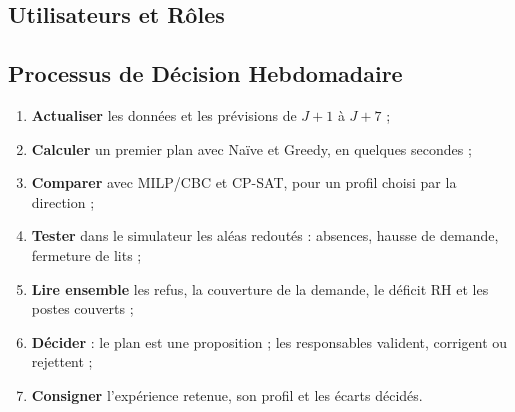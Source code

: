 \subsection{Utilisateurs et Rôles}
\begin{table}[H]
    \centering
    \caption{Utilisateurs visés et vues du tableau de bord associées.}
    \label{tab:utilisateurs}
\end{table}

\subsection{Processus de Décision Hebdomadaire}
\begin{enumerate}
    \item \textbf{Actualiser} les données et les prévisions de $J+1$ à $J+7$ ;
    \item \textbf{Calculer} un premier plan avec Naïve et Greedy, en quelques secondes ;
    \item \textbf{Comparer} avec MILP/CBC et CP-SAT, pour un profil choisi par la direction ;
    \item \textbf{Tester} dans le simulateur les aléas redoutés : absences, hausse de demande, fermeture de lits ;
    \item \textbf{Lire ensemble} les refus, la couverture de la demande, le déficit RH et les postes couverts ;
    \item \textbf{Décider} : le plan est une proposition ; les responsables valident, corrigent ou rejettent ;
    \item \textbf{Consigner} l'expérience retenue, son profil et les écarts décidés.
\end{enumerate}

